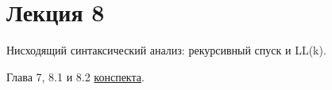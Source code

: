 \section{Лекция 8}

Нисходящий синтаксический анализ: рекурсивный спуск и LL(k).


Глава 7, 8.1 и 8.2 \href{https://github.com/YaccConstructor/articles/blob/master/InProgress/Formal_langs_CFPQ_course_notes/Formal_lang_CFPQ_course_notes.pdf}{конспекта}.
